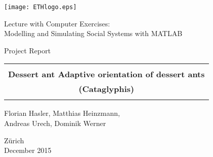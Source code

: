 
\thispagestyle{empty}

\begin{center}
\texttt{[image: ETHlogo.eps]}

\bigskip


\bigskip


\bigskip


\LARGE{ 	Lecture with Computer Exercises:\\ }
\LARGE{ Modelling and Simulating Social Systems with MATLAB\\}

\bigskip

\bigskip

\small{Project Report}\\

\bigskip

\bigskip

\bigskip

\bigskip


\begin{tabular}{|c|}
\hline
\\
\textbf{\LARGE{Dessert ant Adaptive orientation of dessert ants }}\\
\textbf{\LARGE{(Cataglyphis)}}\\
\\
\hline
\end{tabular}
\bigskip

\bigskip

\bigskip

\LARGE{Florian Hasler, Matthias Heinzmann,
\\ Andreas Urech,  Dominik Werner}



\bigskip

\bigskip

\bigskip

\bigskip

\bigskip

\bigskip

\bigskip

\bigskip

Zürich\\
December 2015\\

\end{center}


